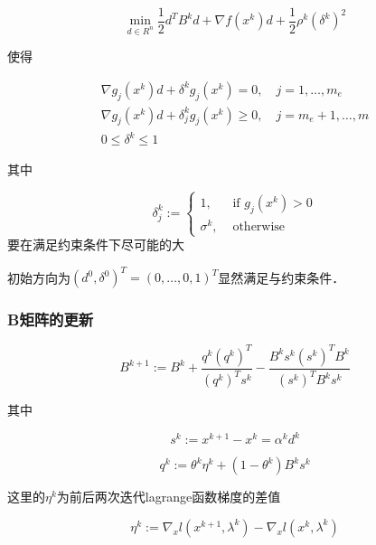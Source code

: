 \documentclass{article}
\begin{document}
\begin{equation}
\min _{d \in R^{n}} \frac{1}{2} d^{T} B^{k} d+\nabla f\left(x^{k}\right) d+\frac{1}{2} \rho^{k}\left(\delta^{k}\right)^{2}
\end{equation}

使得

\begin{equation}\begin{array}{c}
\nabla g_{j}\left(x^{k}\right) d+\delta^{k} g_{j}\left(x^{k}\right)=0, \quad j=1, \ldots, m_{e} \\
\nabla g_{j}\left(x^{k}\right) d+\delta_{j}^{k} g_{j}\left(x^{k}\right) \geq 0, \quad j=m_{e}+1, \ldots, m \\
0 \leq \delta^{k} \leq 1
\end{array}\end{equation}

其中

\begin{equation}\delta_{j}^{k}:=\left\{\begin{array}{ll}
1, & \text { if } g_{j}\left(x^{k}\right)>0 \\
\sigma^{k}, & \text { otherwise }
\end{array}\right.\end{equation}
要在满足约束条件下尽可能的大

初始方向为$\left(d^{0}, \delta^{0}\right)^{T}=(0, \ldots, 0,1)^{T}$显然满足与约束条件．

\subsubsection{B矩阵的更新}
\begin{equation}
B^{k+1}:=B^{k}+\frac{q^{k}\left(q^{k}\right)^{T}}{\left(q^{k}\right)^{T} s^{k}}-\frac{B^{k} s^{k}\left(s^{k}\right)^{T} B^{k}}{\left(s^{k}\right)^{T} B^{k} s^{k}}
\end{equation}

其中

\begin{equation}
s^{k}:=x^{k+1}-x^{k}=\alpha^{k} d^{k}
\end{equation}

\begin{equation}q^{k}:=\theta^{k} \eta^{k}+\left(1-\theta^{k}\right) B^{k} s^{k}\end{equation}

这里的$\eta^{k}$为前后两次迭代lagrange函数梯度的差值

\begin{equation}
\eta^{k}:=\nabla_{x} l\left(x^{k+1}, \lambda^{k}\right)-\nabla_{x} l\left(x^{k}, \lambda^{k}\right)
\end{equation}
\end{document}
